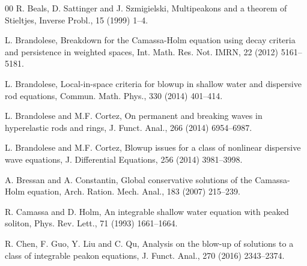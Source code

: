 \documentclass[preprint,12pt]{elsarticle}
\numberwithin{equation}{section}
\begin{document}
\begin{thebibliography}{00}
 R. Beals, D. Sattinger and J. Szmigielski, Multipeakons and a theorem of Stieltjes, Inverse Probl., 15 (1999) 1--4.

 L. Brandolese, Breakdown for the Camassa-Holm equation using decay criteria and persistence in weighted spaces, Int. Math. Res. Not. IMRN, 22 (2012) 5161--5181.

 L. Brandolese, Local-in-space criteria for blowup in shallow water and dispersive rod equations, Commun. Math. Phys., 330 (2014) 401--414.

 L. Brandolese and M.F. Cortez, On permanent and breaking waves in hyperelastic rods and rings, J. Funct. Anal., 266 (2014) 6954--6987.

 L. Brandolese and M.F. Cortez, Blowup issues for a class of nonlinear dispersive wave equations, J. Differential Equations, 256 (2014) 3981--3998.

 A. Bressan and A. Constantin, Global conservative solutions of the Camassa-Holm equation, Arch. Ration. Mech. Anal., 183 (2007) 215--239.

 R. Camassa and D. Holm, An integrable shallow water equation with peaked soliton, Phys. Rev. Lett., 71 (1993) 1661--1664.


 R. Chen, F. Guo, Y. Liu and C. Qu, Analysis on the blow-up of solutions to a class of integrable peakon equations, J. Funct. Anal., 270 (2016) 2343--2374.






\end{thebibliography}
\end{document}

